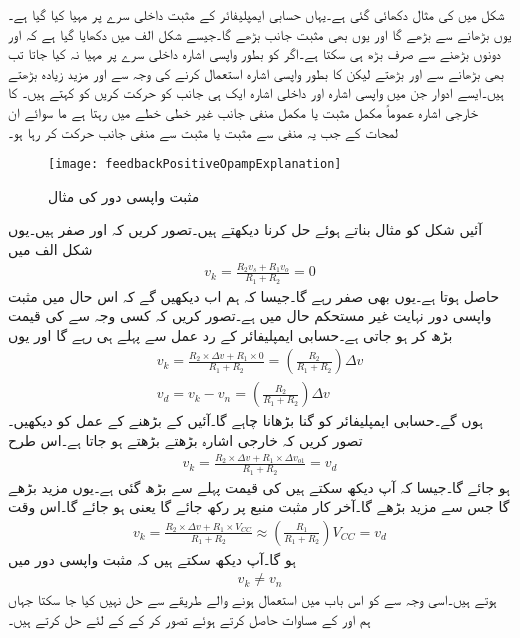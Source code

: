 شکل  میں   کی مثال دکھائی گئی ہے۔یہاں  حسابی ایمپلیفائر کے مثبت داخلی سرے  پر مہیا کیا گیا ہے۔یوں  بڑھانے سے  بڑھے گا اور یوں  بھی مثبت جانب بڑھے گا۔جیسے شکل  الف     میں دکھایا گیا ہے کہ  اور  دونوں بڑھنے سے  صرف بڑھ ہی سکتا ہے۔اگر  کو بطور واپسی اشارہ داخلی سرے  پر مہیا نہ کیا جاتا تب بھی  بڑھانے سے   اور بڑھتے لیکن  کا بطور واپسی اشارہ استعمال کرنے کی وجہ سے    اور   مزید زیادہ بڑھتے ہیں۔ایسے ادوار جن میں واپسی اشارہ اور داخلی اشارہ ایک ہی جانب کو حرکت کریں کو  کہتے ہیں۔  کا خارجی اشارہ  عموماً مکمل مثبت یا مکمل منفی جانب غیر خطی خطے میں رہتا ہے ما سوائے ان لمحات کے جب یہ منفی سے مثبت یا مثبت سے منفی جانب حرکت کر رہا ہو۔
\begin{figure}
\centering
\texttt{[image: feedbackPositiveOpampExplanation]}
\caption{مثبت واپسی دور کی مثال}
\label{شکل_حسابی_مثبت_واپسی_دور}
\end{figure}
آئیں شکل  کو مثال بناتے ہوئے  حل کرنا دیکھتے ہیں۔تصور کریں کہ  اور  صفر ہیں۔یوں شکل  الف     میں 
\begin{align*}
v_k=\frac{R_2 v_s+R_1 v_o}{R_1+R_2}=0
\end{align*}
حاصل ہوتا ہے۔یوں  بھی صفر رہے گا۔جیسا کہ ہم اب دیکھیں گے کہ اس حال میں مثبت واپسی دور نہایت غیر مستحکم حال میں ہے۔تصور کریں کہ کسی وجہ سے  کی قیمت بڑھ کر  ہو جاتی ہے۔حسابی ایمپلیفائر کے رد عمل سے پہلے  ہی رہے گا اور یوں
\begin{align*}
v_k=\frac{R_2 \times \Delta v+R_1 \times  0}{R_1+R_2}=\left(\frac{R_2}{R_1+R_2}\right) \Delta v \\
v_d=v_k-v_n=\left(\frac{R_2}{R_1+R_2}\right) \Delta v 
\end{align*}
ہوں گے۔حسابی ایمپلیفائر  کو  گنا بڑھانا چاہے گا۔آئیں  کے بڑھنے کے عمل کو دیکھیں۔تصور کریں کہ خارجی اشارہ  بڑھتے بڑھتے  ہو جاتا ہے۔اس طرح 
\begin{align*}
v_k=\frac{R_2 \times \Delta v+R_1 \times  \Delta v_{o1}}{R_1+R_2}=v_d
\end{align*}
ہو جائے گا۔جیسا کہ آپ دیکھ سکتے ہیں  کی قیمت پہلے سے بڑھ گئی ہے۔یوں  مزید بڑھے گا جس سے  مزید بڑھے گا۔آخر کار  مثبت منبع پر رکھ جائے گا یعنی  ہو جائے گا۔اس وقت
\begin{align*}
v_k=\frac{R_2 \times \Delta v+R_1 \times  V_{CC}}{R_1+R_2} \approx \left(\frac{R_1}{R_1+R_2} \right) V_{CC}=v_d
\end{align*}
ہو گا۔آپ دیکھ سکتے ہیں کہ مثبت واپسی دور میں 
\begin{align}
v_k \ne v_n
\end{align}
ہوتے ہیں۔اسی وجہ سے  کو اس باب میں استعمال ہونے والے طریقے سے حل نہیں کیا جا سکتا جہاں ہم  اور  کے مساوات حاصل کرتے ہوئے   تصور کر کے  کے لئے حل کرتے ہیں۔

